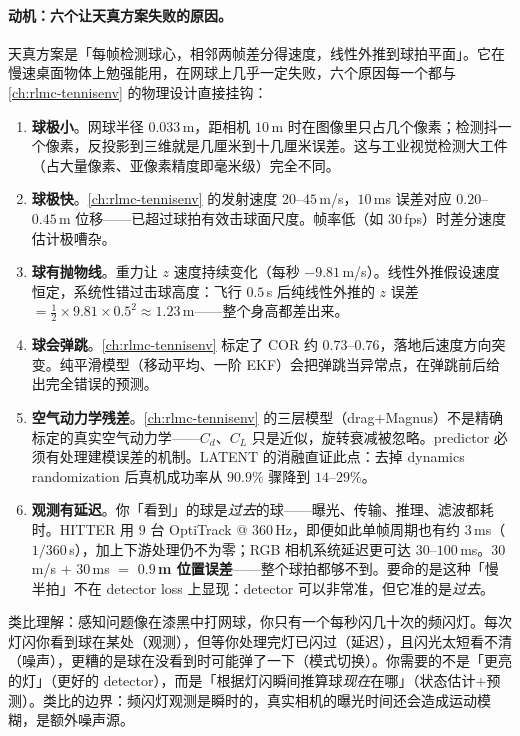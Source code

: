 \paragraph{动机：六个让天真方案失败的原因。}天真方案是「每帧检测球心，相邻两帧差分得速度，线性外推到球拍平面」。它在慢速桌面物体上勉强能用，在网球上几乎一定失败，六个原因每一个都与 \cref{ch:rlmc-tennisenv} 的物理设计直接挂钩：

\begin{enumerate}
  \item \textbf{球极小}。网球半径 $0.033$\,m，距相机 $10$\,m 时在图像里只占几个像素；检测抖一个像素，反投影到三维就是几厘米到十几厘米误差。这与工业视觉检测大工件（占大量像素、亚像素精度即毫米级）完全不同。
  \item \textbf{球极快}。\cref{ch:rlmc-tennisenv} 的发射速度 $20$--$45$\,m/s，$10$\,ms 误差对应 $0.20$--$0.45$\,m 位移——已超过球拍有效击球面尺度。帧率低（如 $30$\,fps）时差分速度估计极嘈杂。
  \item \textbf{球有抛物线}。重力让 $z$ 速度持续变化（每秒 $-9.81$\,m/s）。线性外推假设速度恒定，系统性错过击球高度：飞行 $0.5$\,s 后纯线性外推的 $z$ 误差 $=\tfrac12\times 9.81\times 0.5^2\approx 1.23$\,m——整个身高都差出来。
  \item \textbf{球会弹跳}。\cref{ch:rlmc-tennisenv} 标定了 COR 约 $0.73$--$0.76$，落地后速度方向突变。纯平滑模型（移动平均、一阶 EKF）会把弹跳当异常点，在弹跳前后给出完全错误的预测。
  \item \textbf{空气动力学残差}。\cref{ch:rlmc-tennisenv} 的三层模型（drag$+$Magnus）不是精确标定的真实空气动力学——$C_d$、$C_L$ 只是近似，旋转衰减被忽略。predictor 必须有处理建模误差的机制。LATENT 的消融直证此点：去掉 dynamics randomization 后真机成功率从 $90.9\%$ 骤降到 $14$--$29\%$\cite{tennis_latent2026}。
  \item \textbf{观测有延迟}。你「看到」的球是\emph{过去}的球——曝光、传输、推理、滤波都耗时。HITTER 用 $9$ 台 OptiTrack @ $360$\,Hz\cite{tennis_hitter2025}，即便如此单帧周期也有约 $3$\,ms（$1/360$\,s），加上下游处理仍不为零；RGB 相机系统延迟更可达 $30$--$100$\,ms。$30$\,m/s $+$ $30$\,ms $=$ \textbf{$0.9$\,m 位置误差}——整个球拍都够不到。要命的是这种「慢半拍」不在 detector loss 上显现：detector 可以非常准，但它准的是\emph{过去}。
\end{enumerate}

类比理解：感知问题像在漆黑中打网球，你只有一个每秒闪几十次的频闪灯。每次灯闪你看到球在某处（观测），但等你处理完灯已闪过（延迟），且闪光太短看不清（噪声），更糟的是球在没看到时可能弹了一下（模式切换）。你需要的不是「更亮的灯」（更好的 detector），而是「根据灯闪瞬间推算球\emph{现在}在哪」（状态估计$+$预测）。类比的边界：频闪灯观测是瞬时的，真实相机的曝光时间还会造成运动模糊，是额外噪声源。

